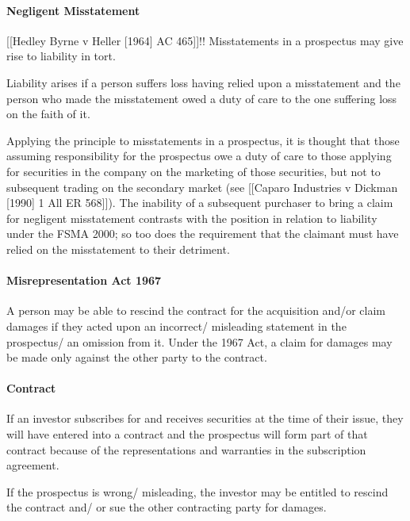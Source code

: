 \documentclass[
]{article}
\begin{document}
\hypertarget{negligent-misstatement}{%
\paragraph{Negligent Misstatement}\label{negligent-misstatement}}

{[}{[}Hedley Byrne v Heller {[}1964{]} AC 465{]}{]}!! Misstatements in a
prospectus may give rise to liability in tort.

Liability arises if a person suffers loss having relied upon a
misstatement and the person who made the misstatement owed a duty of
care to the one suffering loss on the faith of it.

Applying the principle to misstatements in a prospectus, it is thought
that those assuming responsibility for the prospectus owe a duty of care
to those applying for securities in the company on the marketing of
those securities, but not to subsequent trading on the secondary market
(see {[}{[}Caparo Industries v Dickman {[}1990{]} 1 All ER 568{]}{]}).
The inability of a subsequent purchaser to bring a claim for negligent
misstatement contrasts with the position in relation to liability under
the FSMA 2000; so too does the requirement that the claimant must have
relied on the misstatement to their detriment.

\hypertarget{misrepresentation-act-1967}{%
\paragraph{Misrepresentation Act
1967}\label{misrepresentation-act-1967}}

A person may be able to rescind the contract for the acquisition and/or
claim damages if they acted upon an incorrect/ misleading statement in
the prospectus/ an omission from it. Under the 1967 Act, a claim for
damages may be made only against the other party to the contract.

\hypertarget{contract}{%
\paragraph{Contract}\label{contract}}

If an investor subscribes for and receives securities at the time of
their issue, they will have entered into a contract and the prospectus
will form part of that contract because of the representations and
warranties in the subscription agreement.

If the prospectus is wrong/ misleading, the investor may be entitled to
rescind the contract and/ or sue the other contracting party for
damages.
\end{document}
